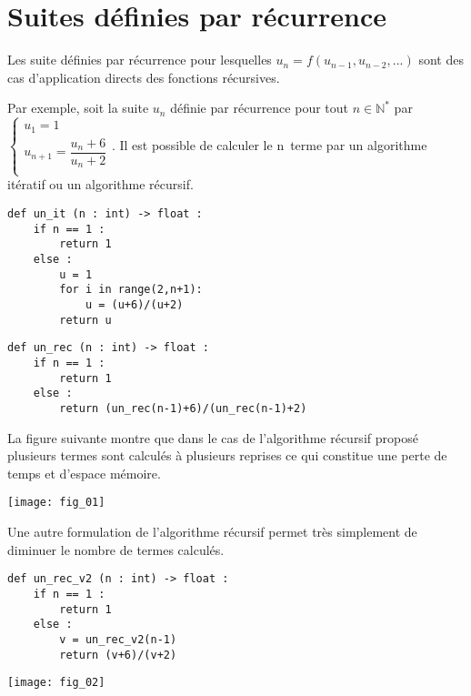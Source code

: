  



\section{Suites définies par récurrence}

Les suite définies par récurrence pour lesquelles $u_{n}=f\left(u_{n-1},u_{n-2},...\right)$ sont des cas d'application directs des fonctions récursives. 

Par exemple, soit la suite $u_n$ définie par récurrence pour tout $n\in\mathbb{N}^*$ par 
$
\left\{
\begin{array}{ll} 
u_1 = 1 \\
u_{n+1} = \dfrac{u_n + 6}{u_n + 2} \\
\end{array}
\right.
$. Il est possible de calculer le n\ieme \, terme par un algorithme itératif ou un algorithme récursif. 

\noindent\begin{minipage}[c]{.45\linewidth}
\begin{lstlisting}
def un_it (n : int) -> float :
    if n == 1 :
        return 1
    else : 
        u = 1
        for i in range(2,n+1):
            u = (u+6)/(u+2)
        return u
\end{lstlisting}
\end{minipage} \hfill
\begin{minipage}[c]{.5\linewidth}
\begin{lstlisting}
def un_rec (n : int) -> float :
    if n == 1 :
        return 1
    else : 
        return (un_rec(n-1)+6)/(un_rec(n-1)+2)
\end{lstlisting}
\end{minipage} 

La figure suivante montre que dans le cas de l'algorithme récursif proposé plusieurs termes sont calculés à plusieurs reprises ce qui constitue une perte de temps et d'espace mémoire. 

\begin{center}
\texttt{[image: fig\_01]}
\end{center}

Une autre formulation de l'algorithme récursif permet très simplement de diminuer le nombre de termes calculés. 



\noindent\begin{minipage}[c]{.45\linewidth}
\begin{lstlisting}
def un_rec_v2 (n : int) -> float :
    if n == 1 :
        return 1
    else : 
        v = un_rec_v2(n-1)
        return (v+6)/(v+2)
\end{lstlisting}
\end{minipage} \hfill
\begin{minipage}[c]{.45\linewidth}
\begin{center}
\texttt{[image: fig\_02]}
\end{center}\end{minipage}


